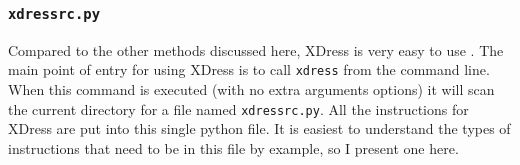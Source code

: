   \subsubsection{\texttt{xdressrc.py}} \label{ssub:xdressrc}


    Compared to the other methods discussed here, XDress is very easy to use . The main point of entry for using XDress is to call \texttt{xdress} from the command line. When this command is executed (with no extra arguments options) it will scan the current directory for a file named \texttt{xdressrc.py}. All the instructions for XDress are put into this single python file. It is easiest to understand the types of instructions that need to be in this file by example, so I present one here.

    \vspace{.2in}
    


